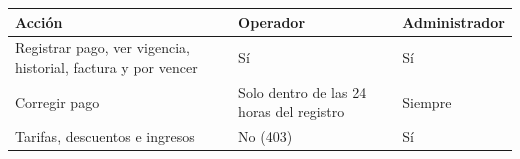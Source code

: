 \begin{longtable}{>{\raggedright\arraybackslash}p{7.4cm}>{\raggedright\arraybackslash}p{4.4cm}>{\raggedright\arraybackslash}p{2.6cm}}
\toprule
\textbf{Acción} & \textbf{Operador} & \textbf{Administrador}\\
\midrule\endhead
Registrar pago, ver vigencia, historial, factura y por vencer & Sí & Sí\\
Corregir pago & Solo dentro de las 24 horas del registro & Siempre\\
Tarifas, descuentos e ingresos & No (403) & Sí\\
\bottomrule
\end{longtable}



